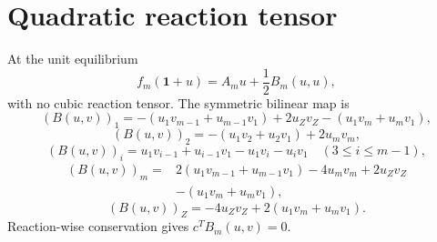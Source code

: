 \section*{Quadratic reaction tensor}
At the unit equilibrium
\[
f_m(\mathbf1+u)=A_mu+\frac12B_m(u,u),
\]
with no cubic reaction tensor.  The symmetric bilinear map is
\[
(B(u,v))_1=-(u_1v_{m-1}+u_{m-1}v_1)+2u_Zv_Z-(u_1v_m+u_mv_1),
\]
\[
(B(u,v))_2=-(u_1v_2+u_2v_1)+2u_mv_m,
\]
\[
(B(u,v))_i=u_1v_{i-1}+u_{i-1}v_1-u_1v_i-u_iv_1
\quad(3\le i\le m-1),
\]
\[
\begin{aligned}
(B(u,v))_m={}&2(u_1v_{m-1}+u_{m-1}v_1)-4u_mv_m+2u_Zv_Z\\
&-(u_1v_m+u_mv_1),
\end{aligned}
\]
\[
(B(u,v))_Z=-4u_Zv_Z+2(u_1v_m+u_mv_1).
\]
Reaction-wise conservation gives $c^TB_m(u,v)=0$.
